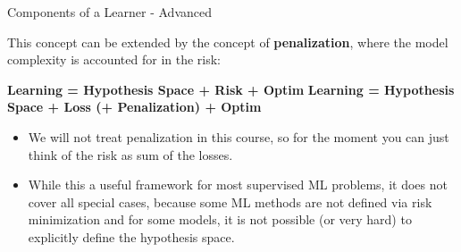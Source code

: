 \documentclass[11pt,compress,t,notes=noshow, xcolor=table]{beamer}
\begin{document}
\begin{vbframe}{Components of a Learner - Advanced}

This concept can be extended by the concept of \textbf{penalization}, where the model complexity is accounted for in the risk:

\lz


  \textbf{Learning = Hypothesis Space +  Risk + Optim }
  \textbf{Learning = Hypothesis Space + Loss (+ Penalization) + Optim}
  

\lz

\begin{itemize}

  \item We will not treat penalization in this course, so for the moment you can just think of the risk as sum of the losses.
  
  \item While this a useful framework for most supervised ML problems, it does not cover all special cases, because some ML methods are not defined via risk minimization and for some models, it is not possible (or very hard) to explicitly define the hypothesis space.
  
\end{itemize}

\end{vbframe}

\end{document}
